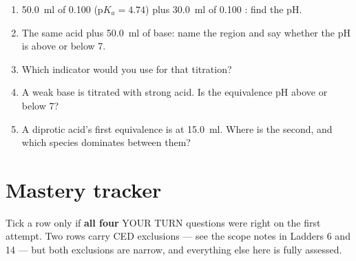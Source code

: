 \documentclass{apchem-worksheet}
\begin{document}
\begin{yourturn}
\begin{enumerate}[leftmargin=*,itemsep=0.5em,label=(\alph*)]
  \item \SI{50.0}{\milli\litre} of \SI{0.100}{\Molar} 
        (p$K_{a} = 4.74$) plus \SI{30.0}{\milli\litre} of
        \SI{0.100}{\Molar} : find the pH.
        \workspace[2.2cm]
  \item The same acid plus \SI{50.0}{\milli\litre} of base: name the
        region and say whether the pH is above or below 7.
        \workspace[1.8cm]
  \item Which indicator would you use for that titration?
        \workspace[1.6cm]
  \item A weak base is titrated with strong acid. Is the equivalence pH
        above or below 7? \workspace[1.6cm]
  \item A diprotic acid's first equivalence is at
        \SI{15.0}{\milli\litre}. Where is the second, and which species
        dominates between them? \workspace[2.0cm]
\end{enumerate}
\end{yourturn}

\section*{\sffamily Mastery tracker}

Tick a row only if \textbf{all four} YOUR TURN questions were right on
the first attempt. Two rows carry CED exclusions --- see the scope notes
in Ladders 6 and 14 --- but both exclusions are narrow, and everything
else here is fully assessed.
\end{document}
